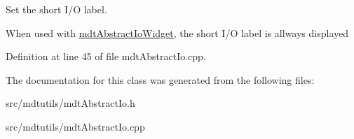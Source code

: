 Set the short I/O label. 

When used with \hyperlink{classmdt_abstract_io_widget}{mdtAbstractIoWidget}, the short I/O label is allways displayed 

Definition at line 45 of file mdtAbstractIo.cpp.



The documentation for this class was generated from the following files:\begin{DoxyCompactItemize}
\item 
src/mdtutils/mdtAbstractIo.h\item 
src/mdtutils/mdtAbstractIo.cpp\end{DoxyCompactItemize}
